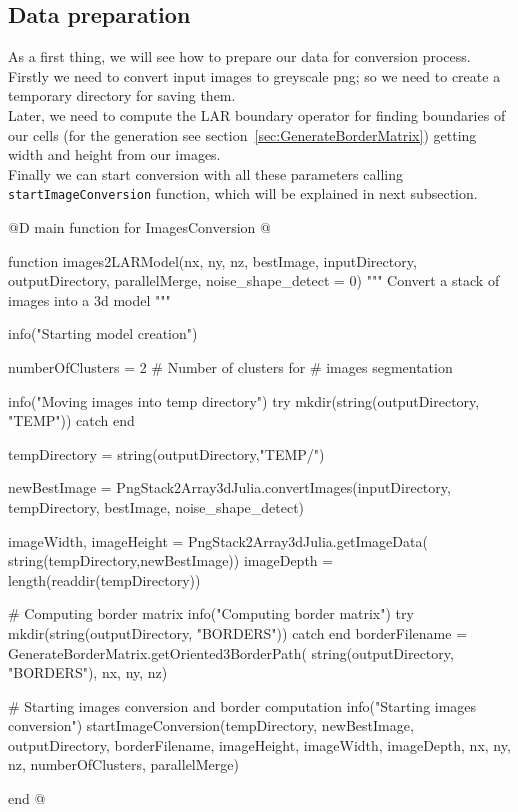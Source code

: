 \documentclass[11pt,oneside]{article}	%
\begin{document}
\subsection{Data preparation}\label{sec:ImagesConversionDataPreparation}
As a first thing, we will see how to prepare our data for conversion process. Firstly we need to convert input images to greyscale png; so we need to create a temporary directory for saving them.\\
Later, we need to compute the LAR boundary operator for finding boundaries of our cells (for the generation see section~\ref{sec:GenerateBorderMatrix}) getting width and height from our images.\\
Finally we can start conversion with all these parameters calling \texttt{startImageConversion} function, which will be explained in next subsection.

@D main function for ImagesConversion
@{function images2LARModel(nx, ny, nz, bestImage,
			inputDirectory, outputDirectory,
			parallelMerge, noise_shape_detect = 0)
  """
  Convert a stack of images into a 3d model
  """

  info("Starting model creation")

  numberOfClusters = 2 # Number of clusters for
                       # images segmentation

  info("Moving images into temp directory")
  try
    mkdir(string(outputDirectory, "TEMP"))
  catch
  end

  tempDirectory = string(outputDirectory,"TEMP/")

  newBestImage = PngStack2Array3dJulia.convertImages(inputDirectory, tempDirectory,
						     bestImage, noise_shape_detect)

  imageWidth, imageHeight = PngStack2Array3dJulia.getImageData(
				      string(tempDirectory,newBestImage))
  imageDepth = length(readdir(tempDirectory))

  # Computing border matrix
  info("Computing border matrix")
  try
    mkdir(string(outputDirectory, "BORDERS"))
  catch
  end
  borderFilename = GenerateBorderMatrix.getOriented3BorderPath(
					string(outputDirectory, "BORDERS"), nx, ny, nz)

  # Starting images conversion and border computation
  info("Starting images conversion")
  startImageConversion(tempDirectory, newBestImage, outputDirectory, borderFilename,
                       imageHeight, imageWidth, imageDepth,
                       nx, ny, nz,
                       numberOfClusters, parallelMerge)

end
@}
\end{document}
